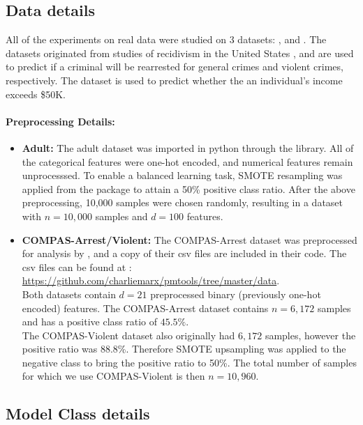 \subsection{Data details}

\label{appx:exp_details:data}
All of the experiments on real data were studied on 3 datasets: , and .
The  datasets originated from studies of recidivism in the United States \citep{angwin2016machine}, and are used to predict if a criminal will be rearrested for general crimes and violent crimes,  respectively.
The  dataset is used to predict whether the an individual's income exceeds \$50K.
\paragraph{Preprocessing Details:}
\begin{itemize}[leftmargin=0.3cm]
    \item \textbf{Adult:}
    The adult dataset was imported in python through the  library. All of the categorical features were one-hot encoded, and numerical features remain unprocesssed. 
    To enable a balanced learning task, SMOTE resampling was applied from the  package to attain a 50\% positive class ratio. 
    After the above preprocessing, 10,000 samples were chosen randomly, resulting in a dataset with $n = 10,000$ samples and $d = 100$ features.
    \item \textbf{COMPAS-Arrest/Violent:}
    The COMPAS-Arrest dataset was preprocessed for analysis by \citet{marx2020predictive}, and a copy of their csv files are included in their code. The csv files can be found at :\\
\url{https://github.com/charliemarx/pmtools/tree/master/data}.\\
    Both datasets contain $d=21$ preprocessed binary (previously one-hot encoded) features.
    The COMPAS-Arrest dataset contains $n=6,172$ samples and has a positive class ratio of $45.5\%$.\\
    The COMPAS-Violent dataset also originally had $6,172$ samples, however the positive ratio was 88.8\%. Therefore SMOTE upsampling was applied to the negative class to bring the positive ratio to  50\%. The total number of samples for which we use COMPAS-Violent is then $n= 10,960$.
\end{itemize}

\subsection{Model Class details}
\label{appx:exp_details:models}

